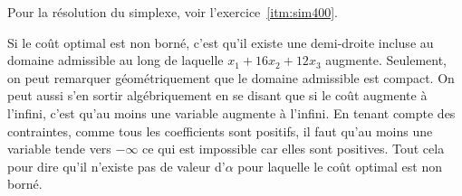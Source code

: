 \begin{enumerate}
    \begin{solution}
      Pour la résolution du simplexe, voir l'exercice~\ref{itm:sim400}.

      Si le coût optimal est non borné,
      c'est qu'il existe une demi-droite incluse au domaine admissible
      au long de laquelle $x_1 + 16x_2 + 12x_3$ augmente.
      Seulement, on peut remarquer géométriquement que le domaine admissible
      est compact.
      On peut aussi s'en sortir algébriquement en se disant que
      si le coût augmente à l'infini, c'est qu'au moins une variable augmente
      à l'infini.
      En tenant compte des contraintes, comme tous les coefficients
      sont positifs, il faut qu'au moins une variable tende vers
      $-\infty$ ce qui est impossible car elles sont positives.
      Tout cela pour dire qu'il n'existe pas de valeur d'$\alpha$
      pour laquelle le coût optimal est non borné.
    \end{solution}

\end{enumerate}

